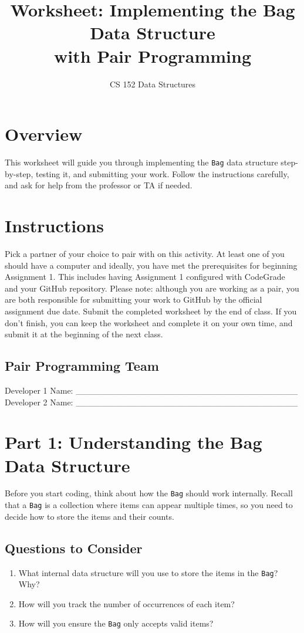 \documentclass[12pt]{article}
\title{Worksheet: Implementing the Bag Data Structure\\with Pair Programming}
\author{CS 152 Data Structures}
\date{}
\begin{document}
\maketitle

\section*{Overview}

This worksheet will guide you through implementing the \texttt{Bag} data structure step-by-step, testing it, and submitting your work. Follow the instructions carefully, and ask for help from the professor or TA if needed. 
\section*{Instructions}

Pick a partner of your choice to pair with on this activity. At least one of you should have a computer and ideally, you have met the prerequisites for beginning Assignment 1. This includes having Assignment 1 configured with CodeGrade and your GitHub repository. Please note: although you are working as a pair, you are both responsible for submitting your work to GitHub by the official assignment due date. Submit the completed worksheet by the end of class. If you don't finish, you can keep the worksheet and complete it on your own time, and submit it at the beginning of the next class.


\subsection*{Pair Programming Team}

\noindent Developer 1 Name: \_\_\_\_\_\_\_\_\_\_\_\_\_\_\_\_\_\_\_\_\_\_\_\_\_\_\_\_\_\_\_\_\_\_\_\_ \\
\noindent Developer 2 Name: \_\_\_\_\_\_\_\_\_\_\_\_\_\_\_\_\_\_\_\_\_\_\_\_\_\_\_\_\_\_\_\_\_\_\_\_

\section*{Part 1: Understanding the Bag Data Structure}

Before you start coding, think about how the \texttt{Bag} should work internally. Recall that a \texttt{Bag} is a collection where items can appear multiple times, so you need to decide how to store the items and their counts.

\subsection*{Questions to Consider}
\begin{enumerate}
    \item What internal data structure will you use to store the items in the \texttt{Bag}? Why?
    \item How will you track the number of occurrences of each item?
    \item How will you ensure the \texttt{Bag} only accepts valid items?
\end{enumerate}
\end{document}
